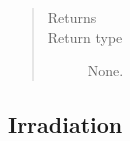 \documentclass[letterpaper,10pt,english]{sphinxmanual}
\begin{document}
\begin{fulllineitems}
\begin{fulllineitems}
\begin{quote}
\begin{description}
\item[{Returns}] \leavevmode


\item[{Return type}] \leavevmode
None.

\end{description}\end{quote}

\end{fulllineitems}


\end{fulllineitems}



\subsection{Irradiation}
\label{\detokenize{api/inputgeneration:irradiation}}
\end{document}
